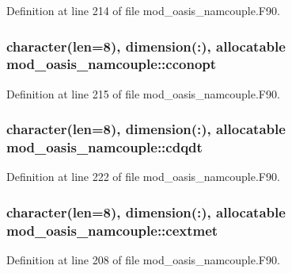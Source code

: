 Definition at line 214 of file mod\+\_\+oasis\+\_\+namcouple.\+F90.

\hypertarget{classmod__oasis__namcouple_a240979dfe7369da899b0cfe2aeba4f9d}{
\subsubsection[{cconopt}]{\setlength{\rightskip}{0pt plus 5cm}character(len=8), dimension(\+:), allocatable mod\+\_\+oasis\+\_\+namcouple\+::cconopt\hspace{0.3cm}{\ttfamily [private]}}}\label{classmod__oasis__namcouple_a240979dfe7369da899b0cfe2aeba4f9d}


Definition at line 215 of file mod\+\_\+oasis\+\_\+namcouple.\+F90.

\hypertarget{classmod__oasis__namcouple_a9c5a3b3a864f3feb95eddc08616b998e}{
\subsubsection[{cdqdt}]{\setlength{\rightskip}{0pt plus 5cm}character(len=8), dimension(\+:), allocatable mod\+\_\+oasis\+\_\+namcouple\+::cdqdt\hspace{0.3cm}{\ttfamily [private]}}}\label{classmod__oasis__namcouple_a9c5a3b3a864f3feb95eddc08616b998e}


Definition at line 222 of file mod\+\_\+oasis\+\_\+namcouple.\+F90.

\hypertarget{classmod__oasis__namcouple_a1066d92e6c9301bdb46ddda7edd7d29a}{
\subsubsection[{cextmet}]{\setlength{\rightskip}{0pt plus 5cm}character(len=8), dimension(\+:), allocatable mod\+\_\+oasis\+\_\+namcouple\+::cextmet\hspace{0.3cm}{\ttfamily [private]}}}\label{classmod__oasis__namcouple_a1066d92e6c9301bdb46ddda7edd7d29a}


Definition at line 208 of file mod\+\_\+oasis\+\_\+namcouple.\+F90.

